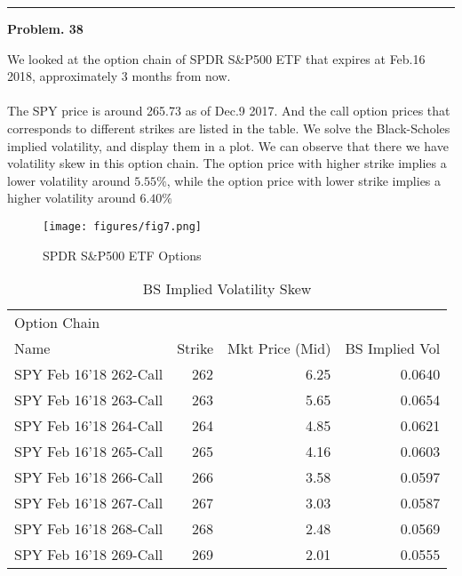\documentclass[10 pt]{hwtemplate} %
\begin{document}
\noindent\rule{16cm}{0.4pt}
\textbf{Problem. 38} 
\begin{solution} We looked at the option chain of SPDR S\&P500 ETF that expires at Feb.16 2018, approximately 3 months from now.\\
~\\
The SPY price is around 265.73 as of Dec.9 2017. And the call option prices that corresponds to different strikes are listed in the table. We solve the Black-Scholes implied volatility, and display them in a plot. We can observe that there we have volatility skew in this option chain. The option price with higher strike implies a lower volatility around $5.55\%$, while the option price with lower strike implies a higher volatility around $6.40\%$

\begin{figure}[H]
  \centering
  \captionsetup{justification=centering}
  \caption{SPDR S\&P500 ETF Options}
  \texttt{[image: figures/fig7.png]}
\end{figure}

\begin{table}[htbp]
  \centering
  \caption{BS Implied Volatility Skew}
    \begin{tabular}{lrrr}
    \toprule
    Option Chain &       &       &  \\
    Name  & \multicolumn{1}{l}{Strike} & \multicolumn{1}{l}{Mkt Price (Mid)} & \multicolumn{1}{l}{BS Implied Vol} \\
    \midrule
    SPY Feb 16'18 262-Call & 262   & 6.25  & 0.0640 \\
    SPY Feb 16'18 263-Call & 263   & 5.65  & 0.0654 \\
    SPY Feb 16'18 264-Call & 264   & 4.85  & 0.0621 \\
    SPY Feb 16'18 265-Call & 265   & 4.16  & 0.0603 \\
    SPY Feb 16'18 266-Call & 266   & 3.58  & 0.0597 \\
    SPY Feb 16'18 267-Call & 267   & 3.03  & 0.0587 \\
    SPY Feb 16'18 268-Call & 268   & 2.48  & 0.0569 \\
    SPY Feb 16'18 269-Call & 269   & 2.01  & 0.0555 \\
    \bottomrule
    \end{tabular}%
  \label{tab:addlabel}%
\end{table}%


\end{solution}
\end{document}
